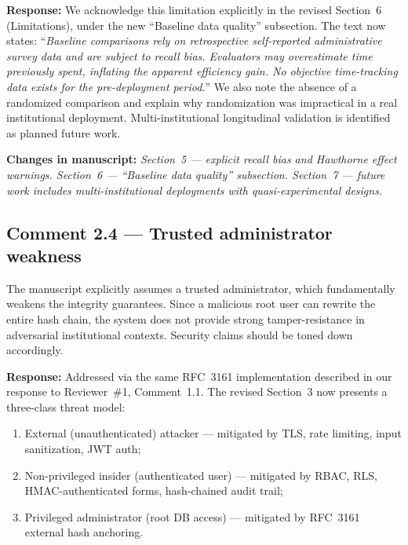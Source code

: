 \documentclass[11pt,a4paper]{article}
\newcommand{\response}[1]{\par\noindent\textcolor{responsecolor}{\textbf{Response:}} #1}
\newcommand{\change}[1]{\par\noindent\textcolor{changecolor}{\textbf{Changes in manuscript:}} \textit{#1}}
\begin{document}
\response{We acknowledge this limitation explicitly in the revised Section~6 (Limitations), under the new ``Baseline data quality'' subsection. The text now states: ``\textit{Baseline comparisons rely on retrospective self-reported administrative survey data and are subject to recall bias. Evaluators may overestimate time previously spent, inflating the apparent efficiency gain. No objective time-tracking data exists for the pre-deployment period.}'' We also note the absence of a randomized comparison and explain why randomization was impractical in a real institutional deployment. Multi-institutional longitudinal validation is identified as planned future work.}

\change{Section~5 --- explicit recall bias and Hawthorne effect warnings. Section~6 --- ``Baseline data quality'' subsection. Section~7 --- future work includes multi-institutional deployments with quasi-experimental designs.}

\bigskip

\subsection*{Comment 2.4 --- Trusted administrator weakness}

\begin{reviewerbox}
The manuscript explicitly assumes a trusted administrator, which fundamentally weakens the integrity guarantees. Since a malicious root user can rewrite the entire hash chain, the system does not provide strong tamper-resistance in adversarial institutional contexts. Security claims should be toned down accordingly.
\end{reviewerbox}

\response{Addressed via the same RFC~3161 implementation described in our response to Reviewer~\#1, Comment~1.1. The revised Section~3 now presents a three-class threat model:}

\begin{enumerate}[nosep]
  \item External (unauthenticated) attacker --- mitigated by TLS, rate limiting, input sanitization, JWT auth;
  \item Non-privileged insider (authenticated user) --- mitigated by RBAC, RLS, HMAC-authenticated forms, hash-chained audit trail;
  \item Privileged administrator (root DB access) --- mitigated by RFC~3161 external hash anchoring.
\end{enumerate}
\end{document}
